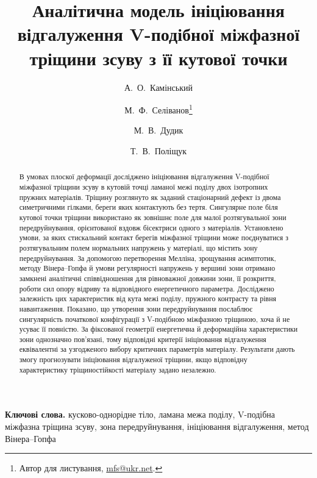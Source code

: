 \title{Аналітична модель ініціювання відгалуження V-подібної міжфазної тріщини зсуву з її кутової точки}

\author[1]{А.~О.~Камінський}
\author[1]{М.~Ф.~Селіванов\thanks{Автор для листування, \href{mailto:mfs@ukr.net}{mfs@ukr.net}.}}
\author[1,2]{М.~В.~Дудик}
\author[2]{Т.~В.~Поліщук}


\newcommand{\UAabstract}{В умовах плоскої деформації досліджено ініціювання відгалуження V-подібної міжфазної тріщини зсуву в кутовій точці ламаної межі поділу двох ізотропних пружних матеріалів. Тріщину розглянуто як заданий стаціонарний дефект із двома симетричними гілками, береги яких контактують без тертя. Сингулярне поле біля кутової точки тріщини використано як зовнішнє поле для малої розтягувальної зони передруйнування, орієнтованої вздовж бісектриси одного з матеріалів. Установлено умови, за яких стискальний контакт берегів міжфазної тріщини може поєднуватися з розтягувальним полем нормальних напружень у матеріалі, що містить зону передруйнування. За допомогою перетворення Мелліна, зрощування асимптотик, методу Вінера--Гопфа й умови регулярності напружень у вершині зони отримано замкнені аналітичні співвідношення для рівноважної довжини зони, її розкриття, роботи сил опору відриву та відповідного енергетичного параметра. Досліджено залежність цих характеристик від кута межі поділу, пружного контрасту та рівня навантаження. Показано, що утворення зони передруйнування послаблює сингулярність початкової конфігурації з V-подібною міжфазною тріщиною, хоча й не усуває її повністю. За фіксованої геометрії енергетична й деформаційна характеристики зони однозначно пов’язані, тому відповідні критерії ініціювання відгалуження еквівалентні за узгодженого вибору критичних параметрів матеріалу. Результати дають змогу прогнозувати ініціювання відгалуженої тріщини, якщо відповідну характеристику тріщиностійкості матеріалу задано незалежно.}

\newcommand{\UAkeywords}{кусково-однорідне тіло, ламана межа поділу, V-подібна міжфазна тріщина зсуву, зона передруйнування, ініціювання відгалуження, метод Вінера--Гопфа}

\maketitle
\begin{abstract}\UAabstract\end{abstract}
\noindent\textbf{Ключові слова.} \UAkeywords\par\medskip

